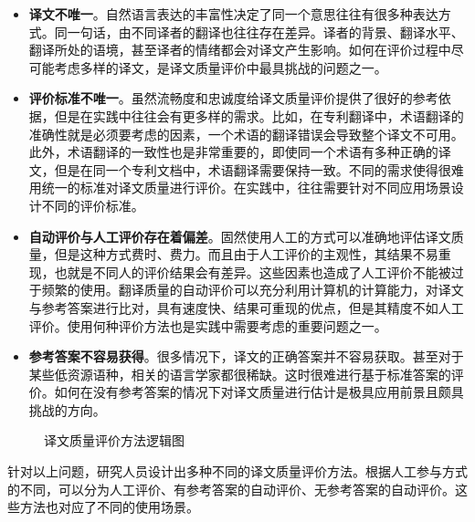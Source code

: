 \begin{itemize}
\vspace{0.5em}
\item {\small\sffamily\bfseries{译文不唯一}}。自然语言表达的丰富性决定了同一个意思往往有很多种表达方式。同一句话，由不同译者的翻译也往往存在差异。译者的背景、翻译水平、翻译所处的语境，甚至译者的情绪都会对译文产生影响。如何在评价过程中尽可能考虑多样的译文，是译文质量评价中最具挑战的问题之一。
\vspace{0.5em}
\item {\small\sffamily\bfseries{评价标准不唯一}}。虽然流畅度和忠诚度给译文质量评价提供了很好的参考依据，但是在实践中往往会有更多样的需求。比如，在专利翻译中，术语翻译的准确性就是必须要考虑的因素，一个术语的翻译错误会导致整个译文不可用。此外，术语翻译的一致性也是非常重要的，即使同一个术语有多种正确的译文，但是在同一个专利文档中，术语翻译需要保持一致。不同的需求使得很难用统一的标准对译文质量进行评价。在实践中，往往需要针对不同应用场景设计不同的评价标准。
\vspace{0.5em}
\item {\small\sffamily\bfseries{自动评价与人工评价存在着偏差}}。固然使用人工的方式可以准确地评估译文质量，但是这种方式费时、费力。而且由于人工评价的主观性，其结果不易重现，也就是不同人的评价结果会有差异。这些因素也造成了人工评价不能被过于频繁的使用。翻译质量的自动评价可以充分利用计算机的计算能力，对译文与参考答案进行比对，具有速度快、结果可重现的优点，但是其精度不如人工评价。使用何种评价方法也是实践中需要考虑的重要问题之一。
\vspace{0.5em}
\item {\small\sffamily\bfseries{参考答案不容易获得}}。很多情况下，译文的正确答案并不容易获取。甚至对于某些低资源语种，相关的语言学家都很稀缺。这时很难进行基于标准答案的评价。如何在没有参考答案的情况下对译文质量进行估计是极具应用前景且颇具挑战的方向。
\vspace{0.5em}
\end{itemize}

\begin{figure}[htp]
    \centering
	
   \caption{译文质量评价方法逻辑图}
   \label{fig:4-2}
\end{figure}

\parinterval 针对以上问题，研究人员设计出多种不同的译文质量评价方法。根据人工参与方式的不同，可以分为人工评价、有参考答案的自动评价、无参考答案的自动评价。这些方法也对应了不同的使用场景。


